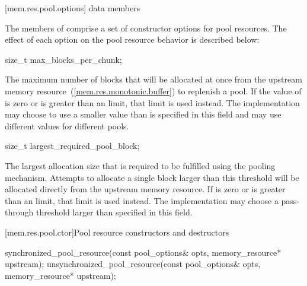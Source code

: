 [mem.res.pool.options]{ data members}

\pnum
The members of 
comprise a set of constructor options for pool resources.
The effect of each option on the pool resource behavior is described below:

%
\begin{itemdecl}
size_t max_blocks_per_chunk;
\end{itemdecl}

\begin{itemdescr}
\pnum
The maximum number of blocks that will be allocated at once
from the upstream memory resource~(\ref{mem.res.monotonic.buffer})
to replenish a pool.
If the value of  is zero or
is greater than an 
limit, that limit is used instead.
The implementation
may choose to use a smaller value than is specified in this field and
may use different values for different pools.
\end{itemdescr}

%
\begin{itemdecl}
size_t largest_required_pool_block;
\end{itemdecl}

\begin{itemdescr}
\pnum
The largest allocation size that is required to be fulfilled
using the pooling mechanism.
Attempts to allocate a single block larger than this threshold
will be allocated directly from the upstream memory resource.
If  is zero or
is greater than an 
limit, that limit is used instead.
The implementation may choose a pass-through threshold
larger than specified in this field.
\end{itemdescr}

[mem.res.pool.ctor]{Pool resource constructors and destructors}

%
%
\begin{itemdecl}
synchronized_pool_resource(const pool_options& opts, memory_resource* upstream);
unsynchronized_pool_resource(const pool_options& opts, memory_resource* upstream);
\end{itemdecl}

